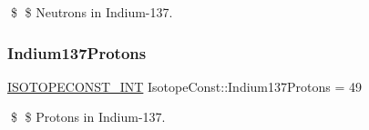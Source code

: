 \$ \$ Neutrons in Indium-\/137. \mbox{\label{group___isotope_const-_indium-_in137_ga8e6e087fc1a8dc0d92fd7354ae98270a}} 
\subsubsection{\texorpdfstring{Indium137\+Protons}{Indium137Protons}}
{\footnotesize\ttfamily \mbox{\hyperlink{group___isotope_const-_macros_ga5f18360b3e99483a35c32d789e62621c}{I\+S\+O\+T\+O\+P\+E\+C\+O\+N\+S\+T\+\_\+\+I\+NT}} Isotope\+Const\+::\+Indium137\+Protons = 49}

\$ \$ Protons in Indium-\/137. 